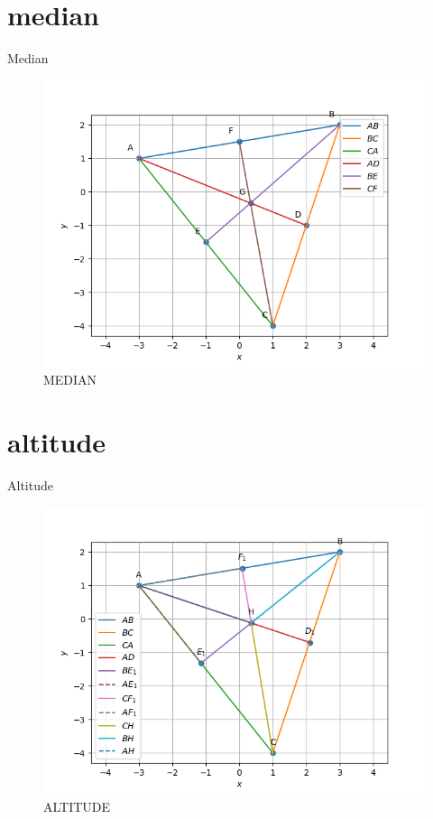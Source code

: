 \documentclass[journal,12pt,onecolumn]{IEEEtran}
\theoremstyle{remark}
\begin{document}
\begin{table}[!ht]
	\section{median}
	\centering
	
	\caption{Median}
	\label{table:median}
\end{table}
\begin{figure}
\includegraphics[width=\columnwidth]{./figs/Q1.2.2.png}
\caption{MEDIAN}
\label{fig:median}
\end{figure}
\begin{table}[!ht]
	\section{altitude}
	\centering
	
	\caption{Altitude}
	\label{table:Altitude}
\end{table}
\begin{figure}
\includegraphics[width=\columnwidth]{./figs/Q1.3.4.png}
\caption{ALTITUDE}
\label{fig:altitude}
\end{figure}
\end{document}

